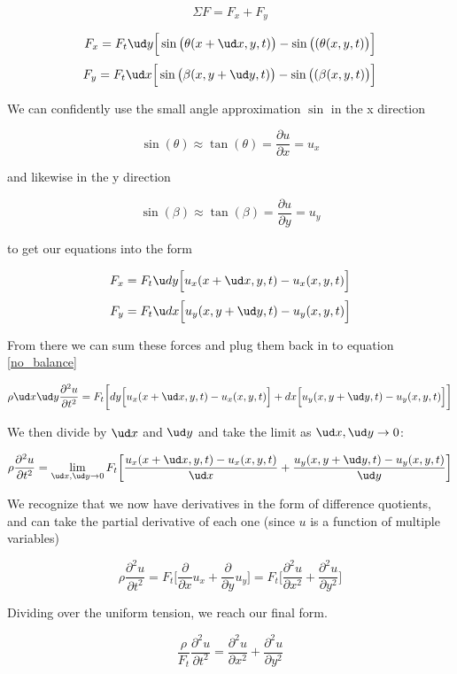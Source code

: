 {$$\Sigma F = F_x + F_y$$

$$F_x = F_t\ud y\Big[\sin\big( \theta (x+\ud x,y,t) \big) - \sin \big((\theta (x,y,t)\big)\Big]$$
$$F_y = F_t\ud x\Big[\sin\big( \beta (x,y+\ud y,t) \big) - \sin \big((\beta (x,y,t)\big)\Big]$$

\noindent We can confidently use the small angle approximation $\sin$ in the x direction

$$ \sin(\theta) \approx \tan(\theta) = \frac{\partial u}{\partial x} = u_x$$

\noindent and likewise in the y direction 

$$ \sin(\beta) \approx \tan(\beta) = \frac{\partial u}{\partial y} = u_y$$

\noindent to get our equations into the form

$$F_x = F_t\u dy\Big[u_x(x+\ud x,y,t) - u_x(x,y,t)\Big]$$
$$F_y = F_t\u dx\Big[u_y(x,y+\ud y,t) - u_y(x,y,t)\Big]$$

\noindent From there we can sum these forces and plug them back in to equation \ref{no_balance}

$$\rho \ud x\ud y \frac{\partial^2u}{\partial t^2} = F_t\bigg[dy\Big[u_x(x+\ud x,y,t) - u_x(x,y,t)\Big]+dx\Big[u_y(x,y+\ud y,t) - u_y(x,y,t)\Big] \bigg]$$

\noindent We then divide by $\ud x$ and $\ud y$ and take the limit as $\ud x,\ud y \to 0$:

$$\rho\frac{\partial^2u}{\partial t^2} = \lim_{\ud x,\ud y\to 0} F_t \bigg[ \frac{u_x(x+\ud x,y,t) - u_x(x,y,t)}{\ud x} + \frac{u_y(x,y+\ud y,t) - u_y(x,y,t)}{\ud y} \bigg]$$

\noindent We recognize that we now have derivatives in the form of difference quotients, and can take the partial derivative of each one (since $u$ is a function of multiple variables)

\begin{equation}
\rho \frac{\partial^2u}{\partial t^2} = F_t\bigg[\frac{\partial}{\partial x}u_x + \frac{\partial}{\partial y}u_y \bigg] = F_t\bigg[\frac{\partial^2 u}{\partial x^2} + \frac{\partial^2 u}{\partial y^2}\bigg]
\end{equation}

\noindent Dividing over the uniform  tension, we reach our final form.

\begin{equation}
\frac{\rho}{F_t}\frac{\partial^2u}{\partial t^2} = \frac{\partial^2 u}{\partial x^2} + \frac{\partial^2 u}{\partial y^2}
\end{equation}

}
